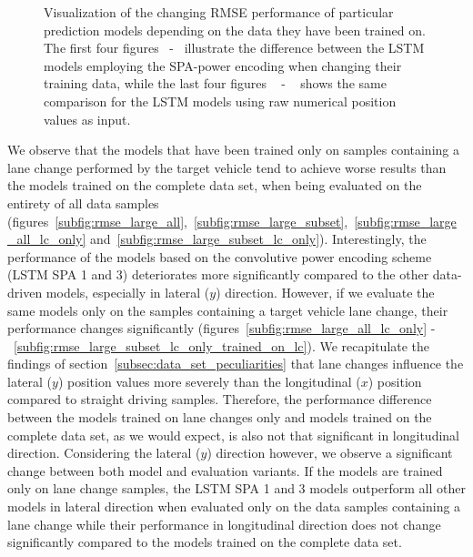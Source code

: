 \begin{figure}[t!]
{    }
    \caption{Visualization of the changing \ac{RMSE} performance of particular prediction models depending on the data they have been trained on.
        The first four figures~\protect{} -~\protect{} illustrate the difference between the \ac{LSTM} models employing the \ac{SPA}-power encoding when changing their training data, while the last four figures ~\protect{} -
        ~\protect{} shows the same comparison for the \ac{LSTM} models using raw numerical position values as input.
    }
    \label{fig:rmse_on_board_training_all_vs_training_on_lc_only}
\end{figure}

We observe that the models that have been trained only on samples containing a lane change performed by the target vehicle tend to achieve worse results than the models trained on the complete data set, when being evaluated on the entirety of all data samples (figures~\ref{subfig:rmse_large_all},~\ref{subfig:rmse_large_subset},~\ref{subfig:rmse_large_all_lc_only} and~\ref{subfig:rmse_large_subset_lc_only}).
Interestingly, the performance of the models based on the convolutive power encoding scheme (\acs{LSTM} \acs{SPA} \num{1} and \num{3}) deteriorates more significantly compared to the other data-driven models, especially in lateral ($y$) direction.
However, if we evaluate the same models only on the samples containing a target vehicle lane change, their performance changes significantly (figures~\ref{subfig:rmse_large_all_lc_only} -~\ref{subfig:rmse_large_subset_lc_only_trained_on_lc}).
We recapitulate the findings of section~\ref{subsec:data_set_peculiarities} that lane changes influence the lateral ($y$) position values more severely than the longitudinal ($x$) position compared to straight driving samples.
Therefore, the performance difference between the models trained on lane changes only and models trained on the complete data set, as we would expect, is also not that significant in longitudinal direction.
Considering the lateral ($y$) direction however, we observe a significant change between both model and evaluation variants.
If the models are trained only on lane change samples, the \ac{LSTM} \acs{SPA} \num{1} and \num{3} models outperform all other models in lateral direction when evaluated only on the data samples containing a lane change while their performance in longitudinal direction does not change significantly compared to the models trained on the complete data set.


